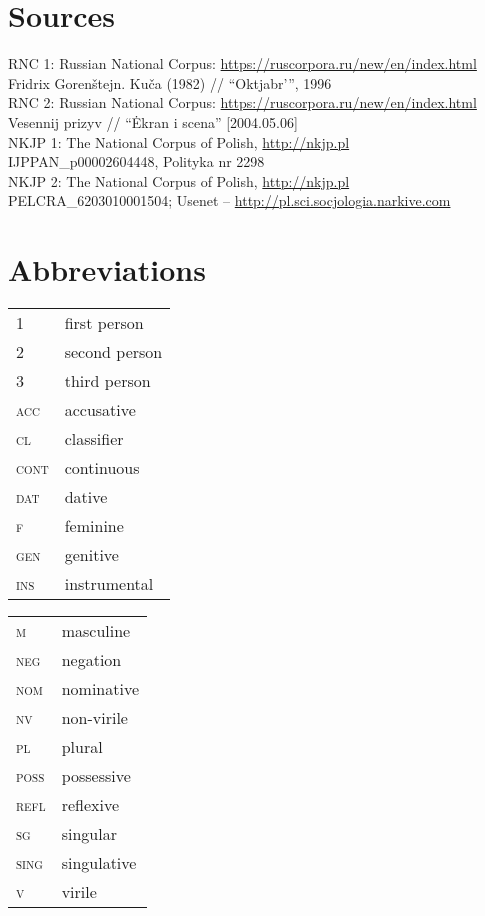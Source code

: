 \documentclass[output=paper,colorlinks,citecolor=brown,
]{langscibook}
\begin{document}

\section*{Sources} 

 RNC 1: Russian National Corpus: \url{https://ruscorpora.ru/new/en/index.html}\\ Fridrix Gorenštejn. Kuča (1982) // ``Oktjabr'{''}, 1996  \\
 
\noindent RNC 2: Russian National Corpus: \url{https://ruscorpora.ru/new/en/index.html}\\ Vesennij prizyv // ``Ėkran i scena'' [2004.05.06] \\

\noindent NKJP 1: The National Corpus of Polish, \url{http://nkjp.pl}\\ IJPPAN\_p00002604448, Polityka nr 2298 \\

\noindent NKJP 2: The National Corpus of Polish, \url{http://nkjp.pl}\\ PELCRA\_6203010001504; Usenet -- \url{http://pl.sci.socjologia.narkive.com}\\


\section*{Abbreviations}
\begin{tabularx}{.45\textwidth}{lQ}
1 & first person \\
2 & second person \\
3 & third person \\
\textsc{acc} & accusative \\
\textsc{cl} & classifier \\
\textsc{cont} & continuous \\
\textsc{dat} & dative \\
\textsc{f} & feminine \\
\textsc{gen} & genitive \\
\textsc{ins} & instrumental \\
\end{tabularx}
\begin{tabularx}{.45\textwidth}{lQ}
\textsc{m} & masculine \\
\textsc{neg} & negation \\
\textsc{nom} & nominative \\
\textsc{nv} & non-virile \\
\textsc{pl} & plural \\
\textsc{poss} & possessive \\
\textsc{refl} & reflexive \\
\textsc{sg} & singular \\
\textsc{sing} & singulative \\
\textsc{v} & virile \\
\end{tabularx}
\end{document}
